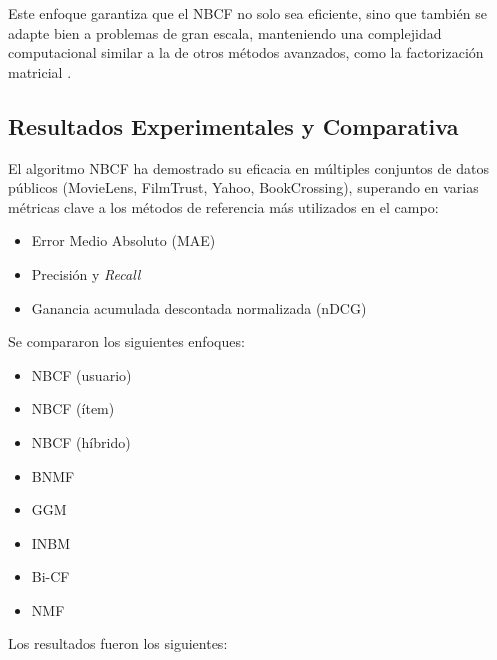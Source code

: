 \documentclass[twocolumn, fontsize=10pt]{article}
\begin{document}
Este enfoque garantiza que el NBCF no solo sea 
eficiente, sino que también se adapte bien a problemas 
de gran escala, manteniendo una complejidad 
computacional similar a la de otros métodos avanzados, 
como la factorización matricial \cite{tesis_sistema_recomendador_hibrido}.

\subsection{Resultados Experimentales y Comparativa}

El algoritmo NBCF ha demostrado su eficacia en 
múltiples conjuntos de datos públicos 
(MovieLens, FilmTrust, Yahoo, BookCrossing)\cite{tesis_sistema_recomendador_hibrido}, superando en 
varias métricas clave a los métodos de referencia más 
utilizados en el campo:
\begin{itemize}
    \item Error Medio Absoluto (MAE)
    \item Precisión y \textit{Recall}
    \item Ganancia acumulada descontada normalizada (nDCG)
\end{itemize}
Se compararon los siguientes enfoques:
\begin{itemize}
    \item NBCF (usuario)
    \item NBCF (ítem)
    \item NBCF (híbrido)
    \item BNMF
    \item GGM
    \item INBM
    \item Bi-CF
    \item NMF
\end{itemize}
Los resultados fueron los siguientes:
\end{document}
